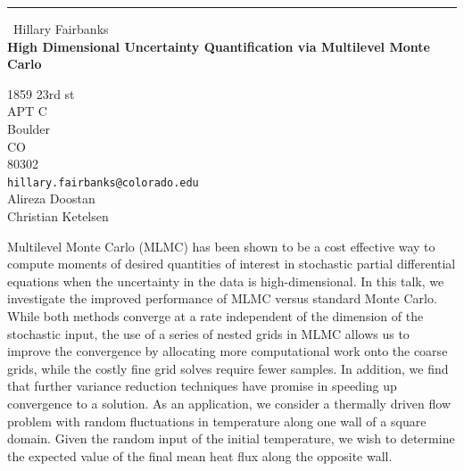 \documentclass{report}
\begin{document}
\begin{center}
\rule{6in}{1pt} \
{\large Hillary Fairbanks \\
{\bf High Dimensional Uncertainty Quantification via Multilevel Monte Carlo}}

1859 23rd st \\ APT C \\ Boulder \\ CO \\ 80302
\\
{\tt hillary.fairbanks@colorado.edu}\\
Alireza Doostan\\
Christian Ketelsen\end{center}

Multilevel Monte Carlo (MLMC) has been shown to be a cost effective way
to compute moments of desired quantities of interest in stochastic
partial differential equations when the uncertainty in the data is
high-dimensional. In this talk, we investigate the improved performance
of MLMC versus standard Monte Carlo. While both methods converge at a
rate independent of the dimension of the stochastic input, the use of a
series of nested grids in MLMC allows us to improve the convergence by
allocating more computational work onto the coarse grids, while the
costly fine grid solves require fewer samples. In addition, we find that
further variance reduction techniques have promise in speeding up
convergence to a solution. As an application, we consider a thermally
driven flow problem with random fluctuations in temperature along one
wall of a square domain. Given the random input of the initial
temperature, we wish to determine the expected value of the final mean
heat flux along the opposite wall.
\end{document}
